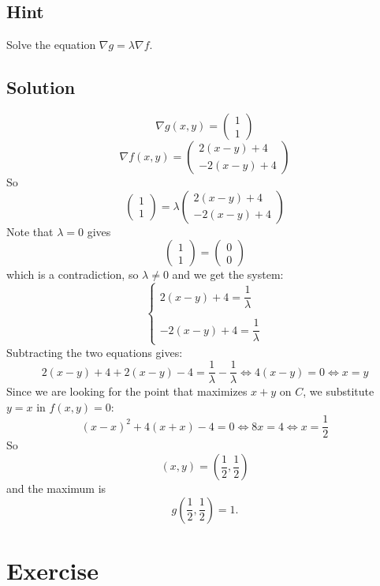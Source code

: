\documentclass[a4paper,10pt]{article}
\begin{document}
\subsection{Hint}
Solve the equation $\nabla g = \lambda\nabla f$.

\subsection{Solution}
\[
    \nabla g(x,y) = \begin{pmatrix} 1 \\ 1 \end{pmatrix}
\]
\[
    \nabla f(x,y) = \begin{pmatrix} 2(x-y) + 4 \\ -2(x-y) + 4 \end{pmatrix}
\]
So
\[
    \begin{pmatrix} 1 \\ 1 \end{pmatrix} = \lambda \begin{pmatrix} 2(x-y) + 4 \\ -2(x-y) + 4 \end{pmatrix}
\]
Note that $\lambda = 0$ gives
\[
    \begin{pmatrix} 1 \\ 1 \end{pmatrix} = \begin{pmatrix} 0 \\ 0 \end{pmatrix}
\]
which is a contradiction, so $\lambda \neq 0$ and we get the system:
\[
    \begin{cases}
        2(x-y) + 4 = \dfrac{1}{\lambda} \\ \\
        -2(x-y) + 4 = \dfrac{1}{\lambda}
    \end{cases}
\]
Subtracting the two equations gives:
\[
    2(x-y) + 4 + 2(x-y) - 4 =  \frac{1}{\lambda} - \frac{1}{\lambda} \iff 4(x-y) = 0 \iff x = y
\]
Since we are looking for the point that maximizes $x+y$ on $C$, we substitute $y=x$ in $f(x,y)=0$:
\[
    (x-x)^2 + 4(x+x) - 4 = 0 \iff 8x = 4 \iff x = \frac{1}{2}
\]
So
\[
    (x, y) = \left(\frac{1}{2}, \frac{1}{2}\right)
\]
and the maximum is
\[
    g\left(\frac{1}{2}, \frac{1}{2}\right) = 1.
\]

\clearpage

\section{Exercise}
\end{document}
